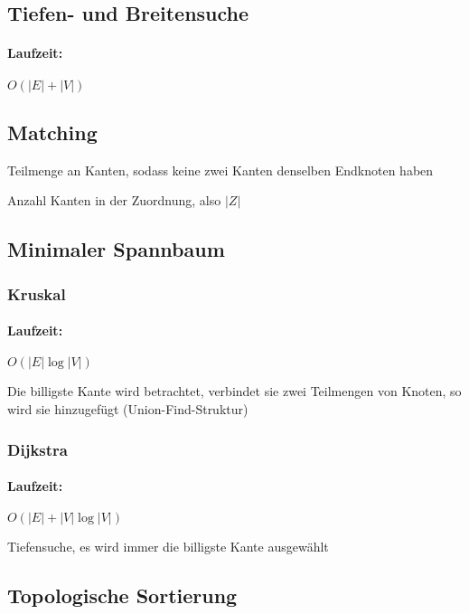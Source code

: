 \documentclass[11pt]{article}
\begin{document}
\subsection{Tiefen- und Breitensuche}

\paragraph{Laufzeit:} $O(|E|+|V|)$

\subsection{Matching}

\begin{description}[labelindent=16pt,style=multiline,leftmargin=5cm, noitemsep]
	\item[Zuordnung] Teilmenge an Kanten, sodass keine zwei Kanten denselben Endknoten haben
	\item[Grösse] Anzahl Kanten in der Zuordnung, also $|Z|$
\end{description}

\subsection{Minimaler Spannbaum}

\subsubsection{Kruskal}

\paragraph{Laufzeit:} $O(|E|\log|V|)$

Die billigste Kante wird betrachtet, verbindet sie zwei Teilmengen von Knoten, so wird sie hinzugefügt (Union-Find-Struktur)

\subsubsection{Dijkstra}

\paragraph{Laufzeit:} $O(|E|+|V|\log|V|)$

Tiefensuche, es wird immer die billigste Kante ausgewählt

\subsection{Topologische Sortierung}
\end{document}

